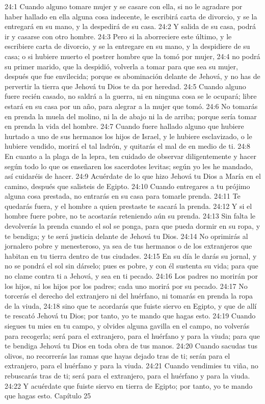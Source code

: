 24:1 Cuando alguno tomare mujer y se casare con ella, si no le agradare por haber hallado en ella alguna cosa indecente, le escribirá carta de divorcio, y se la entregará en su mano, y la despedirá de su casa.  
24:2 Y salida de su casa, podrá ir y casarse con otro hombre.  
24:3 Pero si la aborreciere este último, y le escribiere carta de divorcio, y se la entregare en su mano, y la despidiere de su casa; o si hubiere muerto el postrer hombre que la tomó por mujer,  
24:4 no podrá su primer marido, que la despidió, volverla a tomar para que sea su mujer, después que fue envilecida; porque es abominación delante de Jehová, y no has de pervertir la tierra que Jehová tu Dios te da por heredad.  
24:5 Cuando alguno fuere recién casado, no saldrá a la guerra, ni en ninguna cosa se le ocupará; libre estará en su casa por un año, para alegrar a la mujer que tomó.  
24:6 No tomarás en prenda la muela del molino, ni la de abajo ni la de arriba; porque sería tomar en prenda la vida del hombre.  
24:7 Cuando fuere hallado alguno que hubiere hurtado a uno de sus hermanos los hijos de Israel, y le hubiere esclavizado, o le hubiere vendido, morirá el tal ladrón, y quitarás el mal de en medio de ti.  
24:8 En cuanto a la plaga de la lepra, ten cuidado de observar diligentemente y hacer según todo lo que os enseñaren los sacerdotes levitas; según yo les he mandado, así cuidaréis de hacer.  
24:9 Acuérdate de lo que hizo Jehová tu Dios a María en el camino, después que salisteis de Egipto.  
24:10 Cuando entregares a tu prójimo alguna cosa prestada, no entrarás en su casa para tomarle prenda.  
24:11 Te quedarás fuera, y el hombre a quien prestaste te sacará la prenda.  
24:12 Y si el hombre fuere pobre, no te acostarás reteniendo aún su prenda.  
24:13 Sin falta le devolverás la prenda cuando el sol se ponga, para que pueda dormir en su ropa, y te bendiga; y te será justicia delante de Jehová tu Dios. 
24:14 No oprimirás al jornalero pobre y menesteroso, ya sea de tus hermanos o de los extranjeros que habitan en tu tierra dentro de tus ciudades.  
24:15 En su día le darás su jornal, y no se pondrá el sol sin dárselo; pues es pobre, y con él sustenta su vida; para que no clame contra ti a Jehová, y sea en ti pecado. 
24:16 Los padres no morirán por los hijos, ni los hijos por los padres; cada uno morirá por su pecado. 
24:17 No torcerás el derecho del extranjero ni del huérfano, ni tomarás en prenda la ropa de la viuda,  
24:18 sino que te acordarás que fuiste siervo en Egipto, y que de allí te rescató Jehová tu Dios; por tanto, yo te mando que hagas esto.  
24:19 Cuando siegues tu mies en tu campo, y olvides alguna gavilla en el campo, no volverás para recogerla; será para el extranjero, para el huérfano y para la viuda; para que te bendiga Jehová tu Dios en toda obra de tus manos.  
24:20 Cuando sacudas tus olivos, no recorrerás las ramas que hayas dejado tras de ti; serán para el extranjero, para el huérfano y para la viuda.  
24:21 Cuando vendimies tu viña, no rebuscarás tras de ti; será para el extranjero, para el huérfano y para la viuda.  
24:22 Y acuérdate que fuiste siervo en tierra de Egipto; por tanto, yo te mando que hagas esto.  
Capítulo 25 

